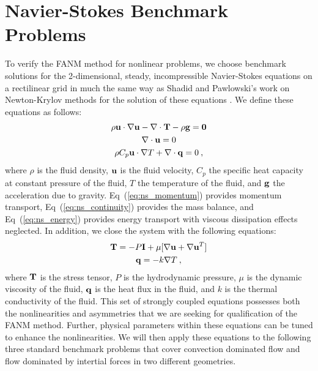 \section{Navier-Stokes Benchmark Problems\ }
\label{sec:ns_benchmarks}
To verify the FANM method for nonlinear problems, we choose benchmark
solutions for the 2-dimensional, steady, incompressible Navier-Stokes
equations on a rectilinear grid in much the same way as Shadid and
Pawlowski's work on Newton-Krylov methods for the solution of these
equations \citep{shadid_inexact_1997,pawlowski_globalization_2006}. We
define these equations as follows:
\begin{subequations}
  \begin{gather}
    \rho \mathbf{u} \cdot \nabla \mathbf{u} - \nabla \cdot \mathbf{T} - \rho
    \mathbf{g} = \mathbf{0}
    \label{eq:ns_momentum}\\
    \nabla \cdot \mathbf{u} = 0
    \label{eq:ns_continuity}\\
    \rho C_p \mathbf{u} \cdot \nabla T + \nabla \cdot \mathbf{q} = 0\:,
    \label{eq:ns_energy}
  \end{gather}
  \label{eq:navier_stokes}
\end{subequations}
where $\rho$ is the fluid density, $\mathbf{u}$ is the fluid velocity,
$C_p$ the specific heat capacity at constant pressure of the fluid,
$T$ the temperature of the fluid, and $\mathbf{g}$ the acceleration due to
gravity. Eq~(\ref{eq:ns_momentum}) provides momentum transport,
Eq~(\ref{eq:ns_continuity}) provides the mass balance, and
Eq~(\ref{eq:ns_energy}) provides energy transport with viscous
dissipation effects neglected. In addition, we close the system with
the following equations:
\begin{subequations}
  \begin{gather}
    \mathbf{T} = -P \mathbf{I} + \mu[\nabla \mathbf{u} + \nabla \mathbf{u}^T]
    \label{eq:ns_stress_tensor}\\
    \mathbf{q} = - k \nabla T\:,
    \label{eq:ns_heat_flux}
  \end{gather}
  \label{eq:ns_closure}
\end{subequations}
where $\mathbf{T}$ is the stress tensor, $P$ is the hydrodynamic pressure,
$\mu$ is the dynamic viscosity of the fluid, $\mathbf{q}$ is the heat flux
in the fluid, and $k$ is the thermal conductivity of the fluid. This
set of strongly coupled equations possesses both the nonlinearities
and asymmetries that we are seeking for qualification of the FANM
method. Further, physical parameters within these equations can be
tuned to enhance the nonlinearities. We will then apply these
equations to the following three standard benchmark problems that
cover convection dominated flow and flow dominated by intertial
forces in two different geometries.

